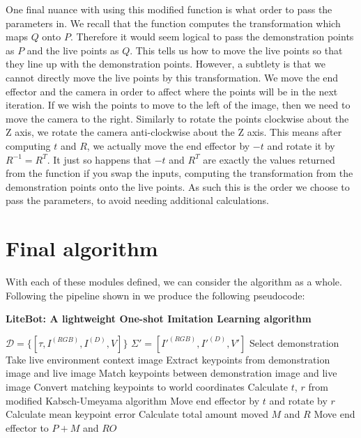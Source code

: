 One final nuance with using this modified function is what order to pass the parameters in. We recall that the function computes the transformation which maps $Q$ onto $P$. Therefore it would seem logical to pass the demonstration points as $P$ and the live points as $Q$. This tells us how to move the live points so that they line up with the demonstration points. However, a subtlety is that we cannot directly move the live points by this transformation. We move the end effector and the camera in order to affect where the points will be in the next iteration. If we wish the points to move to the left of the image, then we need to move the camera to the right. Similarly to rotate the points clockwise about the Z axis, we rotate the camera anti-clockwise about the Z axis. This means after computing $t$ and $R$, we actually move the end effector by $-t$ and rotate it by $R^{-1} = R^T$. It just so happens that $-t$ and $R^T$ are exactly the values returned from the function if you swap the inputs, computing the transformation from the demonstration points onto the live points. As such this is the order we choose to pass the parameters, to avoid needing additional calculations.

\section{Final algorithm}
With each of these modules defined, we can consider the algorithm as a whole. Following the pipeline shown in  we produce the following pseudocode:\\

\begin{algorithm}
    \setlength{\baselineskip}{18pt}
    \caption{\textbf{LiteBot: A lightweight One-shot Imitation Learning algorithm}}
    \label{alg:whole-system}
    \begin{algorithmic}[1]
        \Require $\mathcal{D} = \{[\tau, I^{(RGB)}, I^{(D)}, V]\}$ 
        \Statex $\Sigma' = [I'^{(RGB)}, I'^{(D)}, V']$ 
        \State Select demonstration
        \Repeat
            \State Take live environment context image
            \State Extract keypoints from demonstration image and live image
            \State Match keypoints between demonstration image and live image
            \State Convert matching keypoints to world coordinates
            \State Calculate $t$, $r$ from modified Kabsch-Umeyama algorithm
            \State Move end effector by $t$ and rotate by $r$
            \State Calculate mean keypoint error
        \State Calculate total amount moved $M$ and $R$
            \State Move end effector to $P+M$ and $RO$
        \EndFor
        
    \end{algorithmic}
\end{algorithm}

